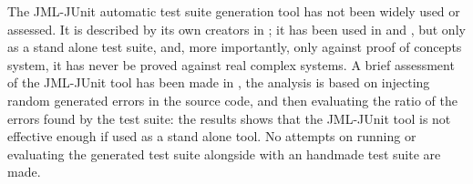 \documentclass[english]{lni}
\begin{document}
The JML-JUnit automatic test suite generation tool has not been widely used or assessed. 
It is described by its own creators in \cite{Cheon2002,Cheon2004,Cheon2005}; it has been used in \cite{Oriat2004} and \cite{Cheon2005}, but only as a stand alone test suite, and, more importantly, only against proof of concepts system, it has never be proved against real complex systems.  
A brief assessment of the JML-JUnit tool has been made in \cite{Tan2004}, the analysis is based on injecting random generated errors in the source code, and then evaluating the ratio of the errors found by the test suite: the results shows that the JML-JUnit tool is not effective enough if used as a stand alone tool. 
No attempts on running or evaluating the generated test suite alongside with an handmade test suite are made.
\end{document}
